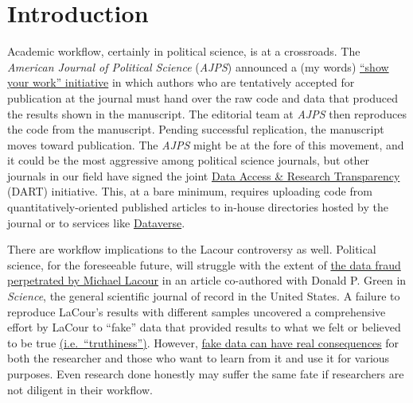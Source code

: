 \documentclass[11pt,]{article}
\begin{document}
\vskip -8.5pt



\noindent  

\hypertarget{introduction}{%
\section{Introduction}\label{introduction}}

Academic workflow, certainly in political science, is at a crossroads.
The \emph{American Journal of Political Science} (\emph{AJPS}) announced
a (my words)
\href{http://ajps.org/2015/03/26/the-ajps-replication-policy-innovations-and-revisions/}{``show
your work'' initiative} in which authors who are tentatively accepted
for publication at the journal must hand over the raw code and data that
produced the results shown in the manuscript. The editorial team at
\emph{AJPS} then reproduces the code from the manuscript. Pending
successful replication, the manuscript moves toward publication. The
\emph{AJPS} might be at the fore of this movement, and it could be the
most aggressive among political science journals, but other journals in
our field have signed the joint
\href{http://www.dartstatement.org/}{Data Access \& Research
Transparency} (DART) initiative. This, at a bare minimum, requires
uploading code from quantitatively-oriented published articles to
in-house directories hosted by the journal or to services like
\href{http://dataverse.org/}{Dataverse}.

There are workflow implications to the Lacour controversy as well.
Political science, for the foreseeable future, will struggle with the
extent of
\href{http://stanford.edu/~dbroock/broockman_kalla_aronow_lg_irregularities.pdf}{the
data fraud perpetrated by Michael Lacour} in an article co-authored with
Donald P. Green in \emph{Science}, the general scientific journal of
record in the United States. A failure to reproduce LaCour's results
with different samples uncovered a comprehensive effort by LaCour to
``fake'' data that provided results to what we felt or believed to be
true
\href{http://chronicle.com/article/LAffaire-LaCour/230905/}{(i.e.~``truthiness'')}.
However,
\href{http://kieranhealy.org/blog/archives/2015/05/20/fake-science-real-consequences/}{fake
data can have real consequences} for both the researcher and those who
want to learn from it and use it for various purposes. Even research
done honestly may suffer the same fate if researchers are not diligent
in their workflow.
\end{document}
